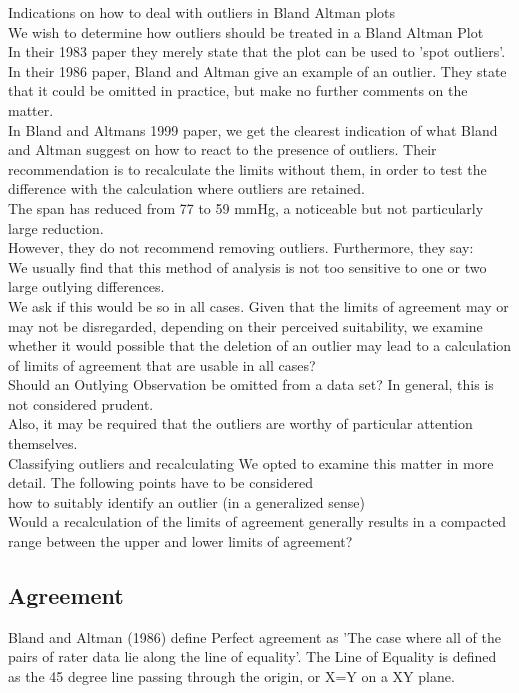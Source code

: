 \documentclass[12pt, a4paper]{report}
\theoremstyle{plain}
\theoremstyle{definition}
\theoremstyle{remark}
\begin{document}
	Indications on how to deal with outliers in Bland Altman plots
	\\
	We wish to determine how outliers should be treated in a Bland
	Altman Plot
	\\
	In their 1983 paper they merely state that the plot can be used to
	'spot outliers'.
	\\
	In  their 1986 paper, Bland and Altman give an example of an
	outlier. They state that it could be omitted in practice, but make
	no further comments on the matter.
	\\
	In Bland and Altmans 1999 paper, we get the clearest indication of
	what Bland and Altman suggest on how to react to the presence of
	outliers. Their recommendation is to recalculate the limits
	without them, in order to test the difference with the calculation
	where outliers are retained.\\
	
	The span has reduced from 77 to 59 mmHg, a noticeable but not
	particularly large reduction.
	\\
	However, they do not recommend removing outliers. Furthermore,
	they say:
	\\
	We usually find that this method of analysis is not too sensitive
	to one or two large outlying differences.
	\\
	We ask if this would be so in all cases. Given that the limits of
	agreement may or may not be disregarded, depending on their
	perceived suitability, we examine whether it would possible that
	the deletion of an outlier may lead to a calculation of limits of
	agreement that are usable in all cases?
	\\
	Should an Outlying Observation be omitted from a data set? In
	general, this is not considered prudent.
	\\
	Also, it may be required that the outliers are worthy of
	particular attention themselves.
	\\
	Classifying outliers and recalculating We opted to examine this
	matter in more detail. The following points have to be considered
	\\how to suitably identify an outlier (in a generalized sense)
	\\Would a recalculation of the limits of agreement generally
	results in  a compacted range between the upper and lower limits
	of agreement?
	\subsection{Agreement} Bland and Altman (1986) define Perfect
	agreement as 'The case where all of the pairs of rater data lie
	along the line of equality'. The Line of Equality is defined as
	the 45 degree line passing through the origin, or X=Y on a XY
	plane.
	
\end{document}
